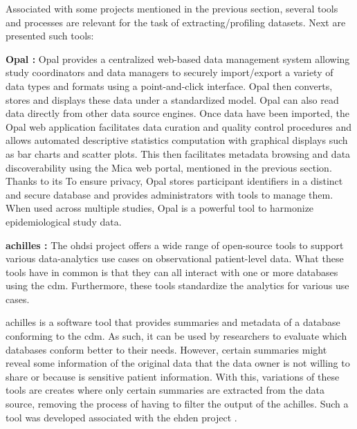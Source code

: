 
Associated with some projects mentioned in the previous section, several tools and
processes are relevant for the task of extracting/profiling datasets.
Next are presented such tools:

\textbf{Opal \cite{mica}:}
Opal provides a centralized web-based data management system allowing study
coordinators and data managers to securely import/export a variety of data types and
formats using a point-and-click interface.
Opal then converts, stores and displays these data under a standardized model.  Opal
can also read data directly from other data source engines.
Once data have been imported, the Opal web application facilitates data curation and
quality control procedures and allows automated descriptive statistics computation with
graphical displays such as bar charts and scatter plots.
This then facilitates metadata browsing and data discoverability using the Mica web
portal, mentioned in the previous section.
Thanks to its To ensure privacy, Opal stores participant identifiers in a distinct and
secure database and provides administrators with tools to manage them.
When used across multiple studies, Opal is a powerful tool to harmonize epidemiological
study data.

\textbf{\gls{achilles} \cite{achilles-github}:}
The \gls{ohdsi} project offers a wide range of open-source tools\cite{ohdsi-tools} to support various data-analytics use cases on observational patient-level data.
What these tools have in common is that they can all interact with one or more
databases using the \gls{cdm}.
Furthermore, these tools standardize the analytics for various use cases.

\gls{achilles} is a software tool that provides summaries and metadata of a database
conforming to the \gls{cdm}.
As such, it can be used by researchers to evaluate which databases conform better to
their needs.
However, certain summaries might reveal some information of the original data that the
data owner is not willing to share or because is sensitive patient information.
With this, variations of these tools are creates where only certain summaries are
extracted from the data source, removing the process of having to filter the output of
the \gls{achilles}.
Such a tool was developed associated with the \gls{ehden} project \cite{peters-tool}.


